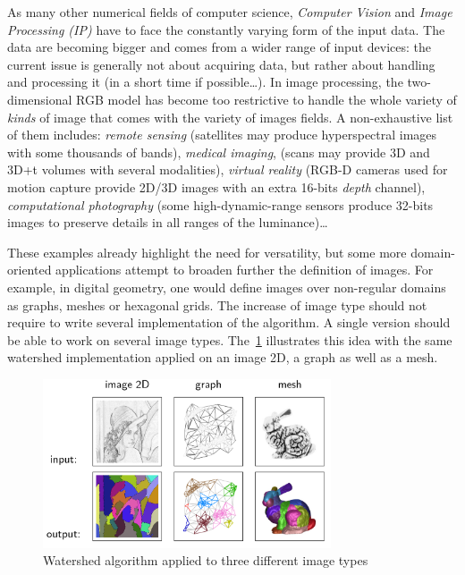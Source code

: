\vspace{1cm}

As many other numerical fields of computer science, \emph{Computer Vision} and \emph{Image Processing (IP)} have to face
the constantly varying form of the input data. The data are becoming bigger and comes from a wider range of input
devices: the current issue is generally not about acquiring data, but rather about handling and processing it (in a
short time if possible\ldots). In image processing, the two-dimensional RGB model has become too restrictive to handle
the whole variety of \emph{kinds} of image that comes with the variety of images fields. A non-exhaustive list of them
includes: \emph{remote sensing} (satellites may produce hyperspectral images with some thousands of bands),
\emph{medical imaging}, (scans may provide 3D and 3D+t volumes with several modalities), \emph{virtual reality} (RGB-D
cameras used for motion capture provide 2D/3D images with an extra 16-bits \emph{depth} channel), \emph{computational
  photography} (some high-dynamic-range sensors produce 32-bits images to preserve details in all ranges of the
luminance)\ldots

These examples already highlight the need for versatility, but some more domain-oriented applications attempt to broaden
further the definition of images. For example, in digital geometry, one would define images over non-regular domains as
graphs, meshes or hexagonal grids. The increase of image type should not require to write several implementation of the
algorithm. A single version should be able to work on several image types. The~\cref{fig.type.vs.algo2} illustrates this
idea with the same watershed implementation applied on an image 2D, a graph as well as a mesh.

\begin{figure}[htbp]
  \centering
  \includegraphics[height=5cm]{figs/type_vs_algo.png}
  \caption{Watershed algorithm applied to three different image types}
  \label{fig.type.vs.algo2}
\end{figure}

